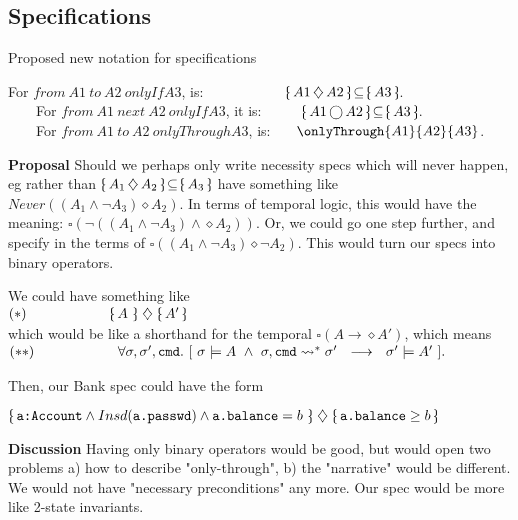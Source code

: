 \label{sect:notation}



\subsection{Specifications} Proposed new notation for specifications 

\noindent 
For $from\ A1\ to\  A2\ onlyIf A3$, is: \ \ \ \ \ \ \  \  \ \ \ $\onlyIf{A1} {A2} {A3}$. \\
\ \ \ \ For $from\ A1\ next\  A2\ onlyIf A3$, it is: \ \ \ \ \  $\onlyIfSingle{A1} {A2} {A3}$.
\\
\ \ \ \  For  $from\ A1\ to\  A2\ onlyThrough A3$, is:  \ \ \ $\onlyThrough{A1} {A2} {A3}$.

\vspace{.3in}
\noindent
\textbf{Proposal} Should we  perhaps only write necessity specs which will never happen, eg rather than 
$\onlyIf{A_1}{A_2}{A_3}$ have something like 
$Never({(A_1 \wedge \neg A_3) \diamond A_2})$. In terms of temporal logic, this would have the meaning: {$\square( \neg ( {(A_1 \wedge \neg A_3)  \wedge  \diamond A_2}))$}.  
Or, we could go one step further, and specify in the terms of $\square( ( A_1 \wedge \neg A_3) \diamond \neg A_2)$. This would turn our specs into binary operators. 

\vspace{.1in}
\noindent
We could have something like \\
$(*)\ \  \strut \ \ \ \ \ \ \ \ \ \ \ \ \ \ \ \   \TwoState{A} {A'}$  \\
which would be like a shorthand for  the temporal  $\square ( A \rightarrow \diamond A')$, which means 
\\
$(**)\ \  \strut \ \ \ \ \ \ \ \ \ \ \ \ \ \ \ \ \forall \sigma, \sigma',\prg{cmd}.\ [ \ \sigma \models A  \ \wedge\ \sigma, \prg{cmd} \leadsto^* \sigma' \    \   \longrightarrow \ \ \sigma' \models A'\ ].$

\vspace{.1in}
\noindent
Then, our Bank spec could have the form 

$\TwoState {\prg{a:Account}\wedge \inside{\prg{a.passwd}} \wedge \prg{a.balance}=b}  {\prg{a.balance}\geq b}$ 

\vspace{.1in}
\noindent
\textbf{Discussion}  Having only binary operators would be good, but would open two problems a) how to describe "only-through", b) the "narrative" would be different. We would not have "necessary preconditions" any more. Our spec would be more like 2-state invariants.

